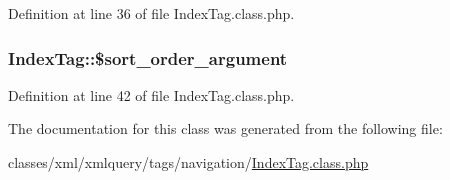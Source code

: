 Definition at line 36 of file Index\+Tag.\+class.\+php.

\subsubsection[{\texorpdfstring{\$sort\+\_\+order\+\_\+argument}{$sort_order_argument}}]{\setlength{\rightskip}{0pt plus 5cm}Index\+Tag\+::\$sort\+\_\+order\+\_\+argument}\hypertarget{classIndexTag_af25bb5754a767188b72ee872e35414e6}{}\label{classIndexTag_af25bb5754a767188b72ee872e35414e6}


Definition at line 42 of file Index\+Tag.\+class.\+php.



The documentation for this class was generated from the following file\+:\begin{DoxyCompactItemize}
\item 
classes/xml/xmlquery/tags/navigation/\hyperlink{IndexTag_8class_8php}{Index\+Tag.\+class.\+php}\end{DoxyCompactItemize}

